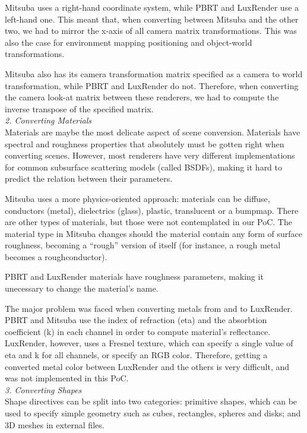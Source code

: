 Mitsuba uses a right-hand coordinate system, while PBRT and LuxRender use a 
left-hand one. This meant that, when converting between Mitsuba and the other 
two, we had to mirror the x-axis of all camera matrix transformations. This was 
also the case for environment mapping positioning and object-world 
transformations. 

Mitsuba also has its camera transformation matrix specified as a camera to world 
 transformation, while PBRT and LuxRender do not. Therefore, when converting the 
camera look-at matrix between these renderers, we had to compute the inverse 
transpose of the specified matrix. \\

\textit{2. Converting Materials} \\
Materials are maybe the most delicate aspect of scene conversion. Materials have 
spectral and roughness properties that absolutely must be gotten right when 
converting scenes. However, most renderers have very different implementations 
for common subsurface scattering models (called BSDFs), making it hard to 
predict the relation between their parameters.

Mitsuba uses a more physics-oriented approach: materials can be diffuse, 
conductors (metal), dielectrics (glass), plastic, translucent or a bumpmap. 
There are other types of materials, but those were not contemplated in our PoC. 
The material type in Mitsuba changes should the material contain any form of 
surface roughness, becoming a ``rough'' version of itself (for instance, a rough 
metal becomes a roughconductor).

PBRT and LuxRender materials have roughness parameters, making it unecessary to 
change the material's name. 

The major problem was faced when converting metals from and to LuxRender. PBRT 
and Mitsuba use the index of refraction (eta) and the absorbtion coefficient (k) 
in each channel in order to compute material's reflectance. LuxRender, however, 
uses a Fresnel texture, which can specify a single value of eta and k for all 
channels, or specify an RGB color. Therefore, getting a converted metal color 
between LuxRender and the others is very difficult, and was not implemented in 
this PoC. \\

\textit{3. Converting Shapes} \\
Shape directives can be split into two categories: primitive shapes, which can 
be used to specify simple geometry such as cubes, rectangles, spheres and disks; 
and 3D meshes in external files. 

